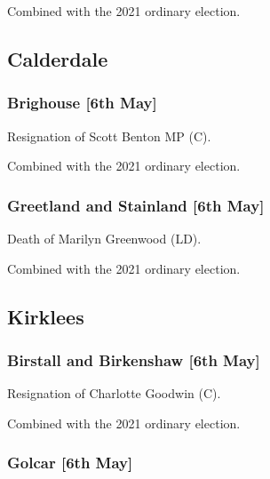 \documentclass[a4paper,openany]{book}
\begin{document}
\begin{resultsiii}
Combined with the 2021 ordinary election.

\subsection*{Calderdale}

\subsubsection*{Brighouse \hspace*{\fill}\nolinebreak[1]%
	\enspace\hspace*{\fill}
	[6th May]}


Resignation of Scott Benton MP (C).

Combined with the 2021 ordinary election.

\subsubsection*{Greetland and Stainland \hspace*{\fill}\nolinebreak[1]%
	\enspace\hspace*{\fill}
	[6th May]}


Death of Marilyn Greenwood (LD).

Combined with the 2021 ordinary election.

\subsection*{Kirklees}

\subsubsection*{Birstall and Birkenshaw \hspace*{\fill}\nolinebreak[1]%
	\enspace\hspace*{\fill}
	[6th May]}


Resignation of Charlotte Goodwin (C).

Combined with the 2021 ordinary election.

\subsubsection*{Golcar \hspace*{\fill}\nolinebreak[1]%
	\enspace\hspace*{\fill}
	[6th May]}


\end{resultsiii}
\end{document}
